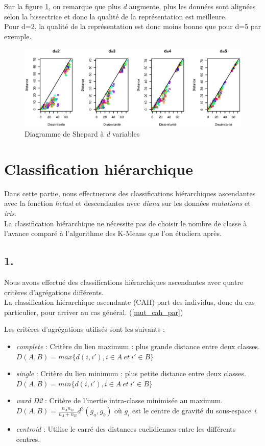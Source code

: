 \documentclass{article}
\begin{document}
Sur la figure \ref{mut_aftd-comp}, on remarque que plus \textit{d} augmente, plus les données sont alignées selon la bissectrice et donc la qualité de la représentation est meilleure.\\
Pour d=2, la qualité de la représentation est donc moins bonne que pour d=5 par exemple.
\begin{figure}[H]
\centering
\includegraphics[scale=0.7]{./img/mut_aftd-comp.eps}
\caption{Diagramme de Shepard à \textit{d} variables}
\label{mut_aftd-comp}
\end{figure}


\section{Classification hiérarchique}

Dans cette partie, nous effectuerons des classifications hiérarchiques ascendantes avec la fonction \textit{hclust} et descendantes avec \textit{diana} sur les données \textit{mutations} et \textit{iris}.\\
La classification hiérarchique ne nécessite pas de choisir le nombre de classe à l'avance comparé à l'algorithme des K-Means que l'on étudiera après.
\subsection*{1.}

Nous avons effectué des classifications hiérarchiques ascendantes avec quatre critères d'agrégations différents.\\
La classification hiérarchique ascendante (CAH) part des individus, donc du cas particulier, pour arriver au cas général. (\ref{mut_cah_par})

Les critères d'agrégations utilisés sont les suivants :
\begin{itemize}
\item \textit{complete} : Critère du lien maximum : plus grande distance entre deux classes. $D(A,B)=max\lbrace d(i,i'),i \in A ~ et ~ i'\in B \rbrace$
\item \textit{single} : Critère du lien minimum : plus petite distance entre deux classes. $D(A,B)=min\lbrace d(i,i'),i \in A ~ et ~ i'\in B \rbrace$
\item \textit{ward D2} : Critère de l'inertie intra-classe minimisée au maximum. $D(A,B)=\frac{n_An_B}{n_A+n_B}d^2 (g_a,g_b)$ où $g_i$ est le centre de gravité du sous-espace \textit{i}.
\item \textit{centroid} : Utilise le carré des distances euclidiennes entre les différents centres.
\end{itemize}
\end{document}
